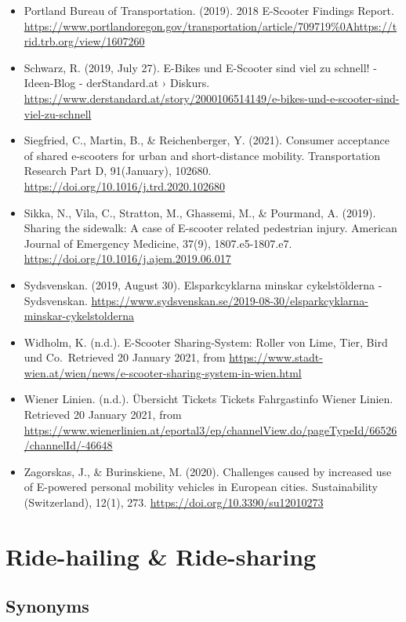 \documentclass[
]{book}
\begin{document}
\begin{itemize}
\item
  Portland Bureau of Transportation. (2019). 2018 E-Scooter Findings Report. \url{https://www.portlandoregon.gov/transportation/article/709719\%0Ahttps://trid.trb.org/view/1607260}
\item
  Schwarz, R. (2019, July 27). E-Bikes und E-Scooter sind viel zu schnell! - Ideen-Blog - derStandard.at › Diskurs. \url{https://www.derstandard.at/story/2000106514149/e-bikes-und-e-scooter-sind-viel-zu-schnell}
\item
  Siegfried, C., Martin, B., \& Reichenberger, Y. (2021). Consumer acceptance of shared e-scooters for urban and short-distance mobility. Transportation Research Part D, 91(January), 102680. \url{https://doi.org/10.1016/j.trd.2020.102680}
\item
  Sikka, N., Vila, C., Stratton, M., Ghassemi, M., \& Pourmand, A. (2019). Sharing the sidewalk: A case of E-scooter related pedestrian injury. American Journal of Emergency Medicine, 37(9), 1807.e5-1807.e7. \url{https://doi.org/10.1016/j.ajem.2019.06.017}
\item
  Sydsvenskan. (2019, August 30). Elsparkcyklarna minskar cykelstölderna - Sydsvenskan. \url{https://www.sydsvenskan.se/2019-08-30/elsparkcyklarna-minskar-cykelstolderna}
\item
  Widholm, K. (n.d.). E-Scooter Sharing-System: Roller von Lime, Tier, Bird und Co.~Retrieved 20 January 2021, from \url{https://www.stadt-wien.at/wien/news/e-scooter-sharing-system-in-wien.html}
\item
  Wiener Linien. (n.d.). Übersicht Tickets \textbar{} Tickets \textbar{} Fahrgastinfo \textbar{} Wiener Linien. Retrieved 20 January 2021, from \url{https://www.wienerlinien.at/eportal3/ep/channelView.do/pageTypeId/66526/channelId/-46648}
\item
  Zagorskas, J., \& Burinskiene, M. (2020). Challenges caused by increased use of E-powered personal mobility vehicles in European cities. Sustainability (Switzerland), 12(1), 273. \url{https://doi.org/10.3390/su12010273}
\end{itemize}

\hypertarget{ride_hailing}{%
\section{Ride-hailing \& Ride-sharing}\label{ride_hailing}}

\hypertarget{synonyms-30}{%
\subsection*{Synonyms}\label{synonyms-30}}
\end{document}
